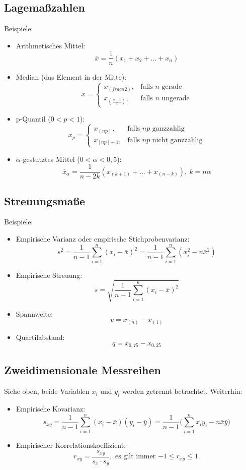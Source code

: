\documentclass[12pt,a4paper]{article}
\begin{document}
\subsection{Lagemaßzahlen}
Beispiele:
\begin{itemize}
\item
Arithmetisches Mittel:
\[ \bar{x} = \frac{1}{n} (x_1 + x_2 + ... + x_n)\]
\item
Median (das Element in der Mitte):
\[\tilde{x} = \left \{ \begin{array}{cl} x_{(frac{n}{2})}, & \text{falls $n$ gerade}  \\ x_{(\frac{n+1}{2})}, & \text{falls $n$ ungerade} \end{array} \right. \]
\item
p-Quantil ($0<p<1$):
\[x_p = \left \{ \begin{array}{cl} x_{(np)}, & \text{falls $np$ ganzzahlig} \\ x_{[np]+1}, & \text{falls $np$ nicht ganzzahlig}\end{array} \right.\]
\item
$\alpha$-gestutztes Mittel ($0 < \alpha < 0,5$):
\[\bar{x}_{\alpha} = \frac{1}{n-2k} (x_{(k+1)} + ... + x_{(n-k)}), \ k = n\alpha\]
\end{itemize}

\subsection{Streuungsmaße}
Beispiele:
\begin{itemize}
\item
Empirische Varianz oder empirische Stichprobenvarianz:
\[s^2 = \frac{1}{n-1} \sum\limits_{i=1}^{n}{(x_i -\bar{x})^2} = \frac{1}{n-1} \sum\limits^{n}_{i=1}{(x_i^2-n \bar{x}^2)}\]
\item
Empirische Streuung:
\[s = \sqrt{\frac{1}{n-1} \sum\limits^{n}_{i=1}{(x_i - \bar{x})^2}}\]
\item
Spannweite:
\[ v = x_{(n)} - x_{(1)}\]
\item
Quartilabstand:
\[q = x_{0,75} - x_{0,25}\]
\end{itemize}

\subsection{Zweidimensionale Messreihen}
Siehe oben, beide Variablen $x_i$ und $y_i$ werden getrennt betrachtet. Weiterhin:
\begin{itemize}
\item
Empirische Kovarianz:
\[s_{xy} = \frac{1}{n-1} \sum\limits^{n}_{i=1}{(x_i - \bar{x})(y_i - \bar{y})} = \frac{1}{n-1} (\sum\limits^{n}_{i = 1}{x_i y_i - n \bar{x} \bar{y})}\]
\item
Empirischer Korrelationskoeffizient:
\[r_{xy} = \frac{s_{xy}}{s_x \cdot s_y}, \text{ es gilt immer $-1 \leq r_{xy} \leq 1$.}\]
\end{itemize}
\end{document}
